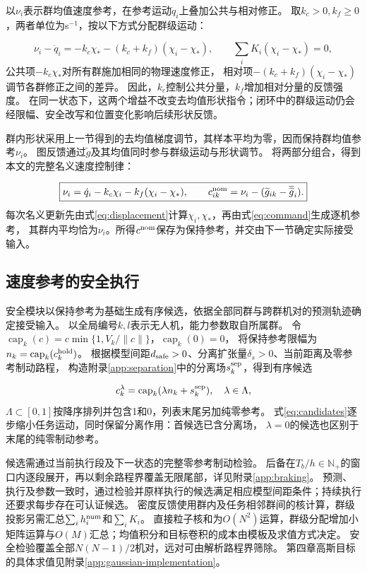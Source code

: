 \documentclass[UTF8,a4paper,11pt,fontset=none]{ctexart}
\newcommand{\capv}{\operatorname{cap}}\newcommand{\dd}{\,\mathrm dx}
\begin{document}
以$\nu_i$表示群均值速度参考，在参考运动$\dot q_i$上叠加公共与相对修正。
取$k_c>0,k_f\ge0$，两者单位为s$^{-1}$，按以下方式分配群级运动：

\begin{equation}
\nu_i-\dot q_i=-k_c\chi_*-(k_c+k_f)(\chi_i-\chi_*),\qquad
\sum_iK_i(\chi_i-\chi_*)=0,
\label{eq:mode-interpretation}
\end{equation}
公共项$-k_c\chi_*$对所有群施加相同的物理速度修正，
相对项$-(k_c+k_f)(\chi_i-\chi_*)$调节各群修正之间的差异。
因此，$k_c$控制公共分量，$k_f$增加相对分量的反馈强度。
在同一状态下，这两个增益不改变去均值形状指令；闭环中的群级运动仍会经限幅、安全改写和位置变化影响后续形状反馈。

群内形状采用上一节得到的去均值梯度调节，其样本平均为零，因而保持群均值参考$\nu_i$。
图反馈通过$\widetilde g$及其均值同时参与群级运动与形状调节。
将两部分组合，得到本文的完整名义速度控制律：

\begin{equation}
\boxed{\nu_i=\dot q_i-k_c\chi_i-k_f(\chi_i-\chi_*),\qquad
c^{\rm nom}_{ik}=\nu_i-(\widetilde g_{ik}-\overline{\widetilde g}_i).}
\label{eq:command}
\end{equation}
每次名义更新先由式\eqref{eq:displacement}计算$\chi_i,\chi_*$，再由式\eqref{eq:command}生成逐机参考，
其群内平均恰为$\nu_i$。所得$c^{\rm nom}$保存为保持参考，并交由下一节确定实际接受输入。

\subsection{速度参考的安全执行}\label{sec:safe-execution}
安全模块以保持参考为基础生成有序候选，依据全部同群与跨群机对的预测轨迹确定接受输入。
以全局编号$k,l$表示无人机，能力参数取自所属群。
令$\capv_k(c)=c\min\{1,V_k/\|c\|\}$，$\capv_k(0)=0$，
将保持参考限幅为$n_k=\capv_k(c_k^{\rm hold})$。
根据模型间距$d_{\rm safe}>0$、分离扩张量$\delta_s>0$、当前距离及零参考制动路程，
构造附录\ref{app:separation}中的分离场$s_k^{\rm sep}$，得到有序候选

\begin{equation}
c_k^\lambda=\capv_k(\lambda n_k+s_k^{\rm sep}),\quad
\lambda\in\Lambda,
\label{eq:candidates}
\end{equation}
$\Lambda\subset[0,1]$按降序排列并包含1和0，列表末尾另加纯零参考。
式\eqref{eq:candidates}逐步缩小任务运动，同时保留分离作用：首候选已含分离场，
$\lambda=0$的候选也区别于末尾的纯零制动参考。

候选需通过当前执行段及下一状态的完整零参考制动检验。
后备在$T_b/h\in\mathbb N_+$的窗口内逐段展开，再以剩余路程界覆盖无限尾部，详见附录\ref{app:braking}。
预测、执行及参数一致时，通过检验并原样执行的候选满足相应模型间距条件；持续执行还要求每步存在可认证候选。
密度反馈使用群内及任务相邻群间的核计算，群级投影另需汇总$\sum_i h_i^{\rm num}$和$\sum_iK_i$。
直接粒子核和为$O(N^2)$运算，群级分配增加小矩阵运算与$O(M)$汇总；均值积分和目标卷积的成本由模板及求值方式决定。
安全检验覆盖全部$N(N-1)/2$机对，远对可由解析路程界筛除。
第四章高斯目标的具体求值见附录\ref{app:gaussian-implementation}。
\end{document}
